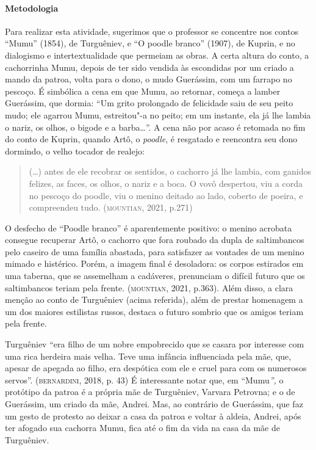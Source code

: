 \documentclass[11pt]{extarticle}
\begin{document}
\paragraph{Metodologia}
Para realizar esta atividade, sugerimos que o professor se concentre nos
contos ``Mumu'' (1854), de Turguêniev, e ``O poodle branco''
(1907), de Kuprin, e no dialogismo e intertextualidade que permeiam as
obras. A certa altura do conto, a cachorrinha Mumu, depois de ter sido
vendida às escondidas por um criado a mando da patroa, volta para o
dono, o mudo Guerássim, com um farrapo no pescoço. É simbólica a cena em
que Mumu, ao retornar, começa a lamber Guerássim, que dormia: ``Um grito
prolongado de felicidade saiu de seu peito mudo; ele agarrou Mumu,
estreitou"-a no peito; em um instante, ela já lhe lambia o nariz, os
olhos, o bigode e a barba\ldots{}''. A cena não por acaso é retomada no fim
do conto de Kuprin, quando Artô, o \emph{poodle}, é resgatado e
reencontra seu dono dormindo, o velho tocador de realejo:

\begin{quote}
(\ldots{}) antes de ele recobrar os sentidos, o cachorro já lhe lambia, com
ganidos felizes, as faces, os olhos, o nariz e a boca. O vovô despertou,
viu a corda no pescoço do poodle, viu o menino deitado ao lado, coberto
de poeira, e compreendeu tudo. (\textsc{mountian}, 2021, p.271)
\end{quote}

O desfecho de ``Poodle branco'' é aparentemente positivo: o menino
acrobata consegue recuperar Artô, o cachorro que fora roubado da dupla
de saltimbancos pelo caseiro de uma família abastada, para satisfazer as
vontades de um menino mimado e histérico. Porém, a imagem final é
desoladora: os corpos estirados em uma taberna, que se assemelham a
cadáveres, prenunciam o difícil futuro que os saltimbancos teriam pela
frente. (\textsc{mountian}, 2021, p.363). Além disso, a clara menção ao conto de
Turguêniev (acima referida), além de prestar homenagem a um dos maiores
estilistas russos, destaca o futuro sombrio que os amigos teriam pela
frente.

\begin{figure}[ht!]
\end{figure}

Turguêniev ``era filho de um nobre empobrecido que se casara por
interesse com uma rica herdeira mais velha. Teve uma infância
influenciada pela mãe, que, apesar de apegada ao filho, era despótica
com ele e cruel para com os numerosos servos''. (\textsc{bernardini}, 2018, p.
43) É interessante notar que, em ``Mumu\emph{'',} o protótipo da patroa
é a própria mãe de Turguêniev, Varvara Petrovna; e o de Guerássim, um
criado da mãe, Andrei. Mas, ao contrário de Guerássim, que faz um gesto
de protesto ao deixar a casa da patroa e voltar à aldeia, Andrei, após
ter afogado sua cachorra Mumu, fica até o fim da vida na casa da mãe de
Turguêniev.
\end{document}
